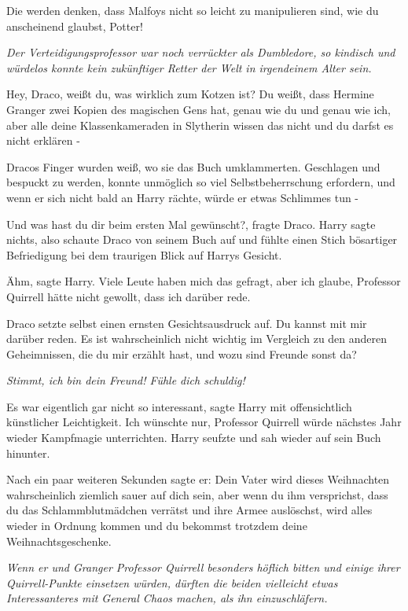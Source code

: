 \glqq{}Die werden denken, dass Malfoys nicht so leicht zu manipulieren sind, wie
du anscheinend glaubst, Potter!\grqq{}

\emph{Der Verteidigungsprofessor war noch verrückter als Dumbledore, so
kindisch und würdelos konnte kein zukünftiger Retter der Welt in irgendeinem
Alter sein.}

\glqq{}Hey, Draco, weißt du, was wirklich zum Kotzen ist? Du weißt, dass Hermine
Granger zwei Kopien des magischen Gens hat, genau wie du und genau wie ich, aber
alle deine Klassenkameraden in Slytherin wissen das nicht und du darfst es nicht
erklären -\grqq{}

Dracos Finger wurden weiß, wo sie das Buch umklammerten. Geschlagen und bespuckt
zu werden, konnte unmöglich so viel Selbstbeherrschung erfordern, und wenn er
sich nicht bald an Harry rächte, würde er etwas Schlimmes tun -

\glqq{}Und was hast du dir beim ersten Mal gewünscht?\grqq{}, fragte Draco. Harry
sagte nichts, also schaute Draco von seinem Buch auf und fühlte einen Stich
bösartiger Befriedigung bei dem traurigen Blick auf Harrys Gesicht.

\glqq{}Ähm\grqq{}, sagte Harry. \glqq{}Viele Leute haben mich das gefragt, aber
ich glaube, Professor Quirrell hätte nicht gewollt, dass ich darüber rede.\grqq{}

Draco setzte selbst einen ernsten Gesichtsausdruck auf. \glqq{}Du kannst mit mir
darüber reden. Es ist wahrscheinlich nicht wichtig im Vergleich zu den anderen
Geheimnissen, die du mir erzählt hast, und wozu sind Freunde sonst da?\grqq{}

\emph{Stimmt, ich bin dein Freund! Fühle dich schuldig!}

\glqq{}Es war eigentlich gar nicht so interessant\grqq{}, sagte Harry mit
offensichtlich künstlicher Leichtigkeit. \glqq{}Ich wünschte nur, Professor
Quirrell würde nächstes Jahr wieder Kampfmagie unterrichten.\grqq{} Harry seufzte und
sah wieder auf sein Buch hinunter.

Nach ein paar weiteren Sekunden sagte er: \glqq{}Dein Vater wird dieses
Weihnachten wahrscheinlich ziemlich sauer auf dich sein, aber wenn du ihm
versprichst, dass du das Schlammblutmädchen verrätst und ihre Armee auslöschst,
wird alles wieder in Ordnung kommen und du bekommst trotzdem deine
Weihnachtsgeschenke.\grqq{}

\emph{Wenn er und Granger Professor Quirrell besonders höflich bitten und
einige ihrer Quirrell-Punkte einsetzen würden, dürften die beiden vielleicht
etwas Interessanteres mit General Chaos machen, als ihn einzuschläfern.}


